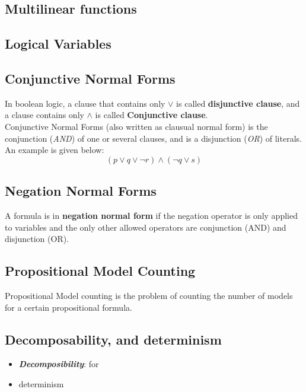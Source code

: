     \subsection{Multi\-linear functions}
    
    \subsection{Logical Variables}
    \subsection{Conjunctive Normal Forms}
    In boolean logic, a clause that contains only $\vee$ is called \textbf{disjunctive clause}, and a clause contains only $\wedge$ is called \textbf{Conjunctive clause}.\\
    Conjunctive Normal Forms (also written as clausual normal form) is  the conjunction (\textit{AND}) of one or several clauses, and is a disjunction (\textit{OR}) of literals. An example is given below: $$(p \vee q \vee \neg r) \wedge (\neg q \vee s)$$
    \subsection{Negation Normal Forms}
    A formula is in \textbf{negation normal form} if the negation operator is only applied to variables and the only other allowed operators are conjunction (AND) and disjunction (OR).
    \subsection{Propositional Model Counting}
    Propositional Model counting is the problem of counting the number of models for a certain propositional formula.\cite{handbook-of-satisfiablity-model-counting}
    
    \subsection{Decomposability, and determinism}
    \begin{itemize}
        \item \textit{\textbf{Decomposibility}}: for
        \item determinism
    \end{itemize}
    